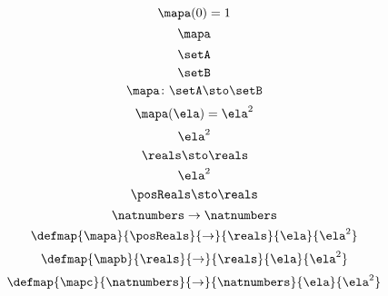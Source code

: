 {\begin{forslides}
    \begin{equation}
        \label{eq:slides_session2_79}
        \mapa(0) =1
    \end{equation}
    \begin{equation}
        \label{eq:slides_session2_80}
        \mapa
    \end{equation}
    \begin{equation}
        \label{eq:slides_session2_81}
        \setA
    \end{equation}
    \begin{equation}
        \label{eq:slides_session2_82}
        \setB
    \end{equation}
    \begin{equation}
        \label{eq:slides_session2_83}
        \mapa\colon \setA \sto \setB
    \end{equation}
    \begin{equation}
        \label{eq:slides_session2_84}
        \mapa(\ela)=\ela^2
    \end{equation}
    \begin{equation}
        \label{eq:slides_session2_85}
        \ela^2
    \end{equation}
    \begin{equation}
        \label{eq:slides_session2_86}
        \reals \sto \reals
    \end{equation}
    \begin{equation}
        \label{eq:slides_session2_87}
        \ela^2
    \end{equation}
    \begin{equation}
        \label{eq:slides_session2_88}
        \posReals \sto \reals
    \end{equation}
    \begin{equation}
        \label{eq:slides_session2_89}
        \natnumbers \to \natnumbers
    \end{equation}
    \begin{equation}
        \label{eq:slides_session2_90}
        \defmap{\mapa}{\posReals}{\to}{\reals}{\ela}{\ela^2}
    \end{equation}
    \begin{equation}
        \label{eq:slides_session2_91}
        \defmap{\mapb}{\reals}{\to}{\reals}{\ela}{\ela^2}
    \end{equation}
    \begin{equation}
        \label{eq:slides_session2_92}
        \defmap{\mapc}{\natnumbers}{\to}{\natnumbers}{\ela}{\ela^2}
    \end{equation}


\end{forslides}}
